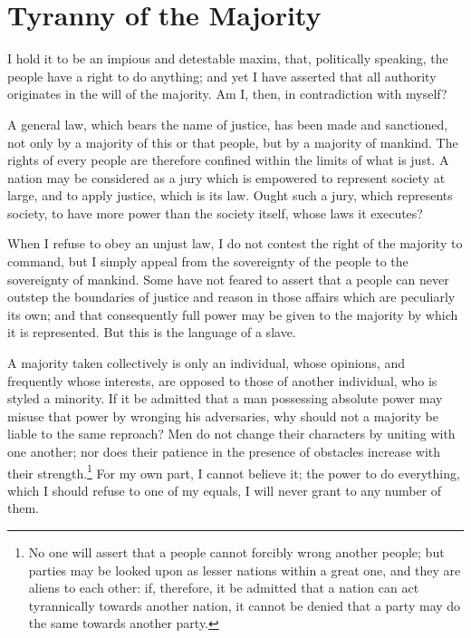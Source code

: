 
\author{Alexis de Tocqueville}
\chapter{Tyranny of the Majority}

\begin{abstract}{h} How the Principle of the Sovereignty of
the People is to be understood---Im\-pos\-si\-bil\-i\-ty of conceiving
a Mixed Government---The Sovereign Power must exist
some\-where---Precautions to be taken to control its
Ac\-tion---These Precautions have not been taken in the United
States---Consequences. \end{abstract}

\noindent I hold it to be an impious and detestable maxim, that,
politically speaking, the people have a right to do anything; and yet
I have asserted that all authority originates in the will of the
majority. Am I, then, in contradiction with myself?

A general law, which bears the name of justice, has been made and
sanctioned, not only by a majority of this or that people, but by a
majority of mankind. The rights of every people are therefore confined
within the limits of what is just. A nation may be considered as a
jury which is empowered to represent society at large, and to apply
justice, which is its law. Ought such a jury, which represents
society, to have more power than the society itself, whose laws it
executes?

When I refuse to obey an unjust law, I do not contest the right of the
majority to command, but I simply appeal from the sovereignty of the
people to the sovereignty of mankind. Some have not feared to assert
that a people can never outstep the boundaries of justice and reason
in those affairs which are peculiarly its own; and that consequently
full power may be given to the majority by which it is represented.
But this is the language of a slave.

A majority taken collectively is only an individual, whose opinions,
and frequently whose interests, are opposed to those of another
individual, who is styled a minority. If it be admitted that a man
possessing absolute power may misuse that power by wronging his
adversaries, why should not a majority be liable to the same
 reproach? Men do not change their characters by uniting
with one another; nor does their patience in the presence of obstacles
increase with their strength.\footnote{No one will assert that a
people cannot forcibly wrong another people; but parties may be looked
upon as lesser nations within a great one, and they are aliens to each
other: if, therefore, it be admitted that a nation can act
tyrannically towards another nation, it cannot be denied that a party
may do the same towards another party.} For my own part, I cannot
believe it; the power to do everything, which I should refuse to one
of my equals, I will never grant to any number of them.


